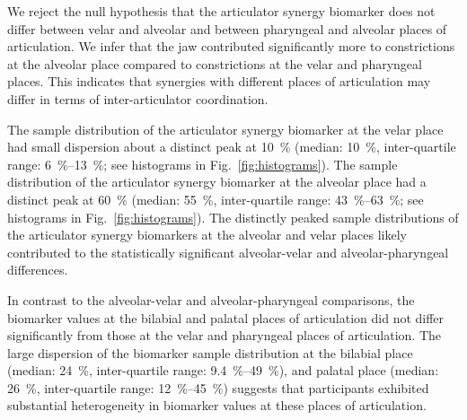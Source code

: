 \documentclass[preprint]{JASAnew}\usepackage[]{graphicx}\usepackage[]{color}
\begin{document}
We reject the null hypothesis that the articulator synergy biomarker does not differ between velar and alveolar and between pharyngeal and alveolar places of articulation. 
%
We infer that the jaw contributed significantly more to constrictions at the alveolar place compared to constrictions at the velar and pharyngeal places.
%
This indicates that synergies with different places of articulation may differ in terms of inter-articulator coordination.




The sample distribution of the articulator synergy biomarker at the velar place had small dispersion about a distinct peak at \SI{10}{\percent} 
%
(median: \SI{10}{\percent}, 
inter-quartile range: \SIrange{6}{13}{\percent}; see histograms in Fig.~\ref{fig:histograms}).
%
The sample distribution of the articulator synergy biomarker at the alveolar place had a distinct peak at \SI{60}{\percent}
%
(median: \SI{55}{\percent}, 
inter-quartile range: \SIrange{43}{63}{\percent}; see histograms in Fig.~\ref{fig:histograms}).
%
The distinctly peaked sample distributions of the articulator synergy biomarkers at the alveolar and velar places likely contributed to the statistically significant alveolar-velar and alveolar-pharyngeal differences.



In contrast to the alveolar-velar and alveolar-pharyngeal comparisons, the biomarker values at the bilabial and palatal places of articulation did not differ significantly from those at the velar and pharyngeal places of articulation. 
%
The large dispersion of the biomarker sample distribution at the bilabial place
%
(median: \SI{24}{\percent}, 
inter-quartile range: \SIrange{9.4}{49}{\percent}), 
%
and palatal place
%
(median: \SI{26}{\percent}, 
inter-quartile range: \SIrange{12}{45}{\percent})
%
suggests that participants exhibited substantial heterogeneity in biomarker values at these places of articulation. 
\end{document}
